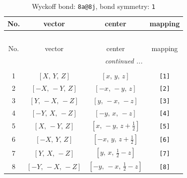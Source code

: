\documentclass[fleqn,8pt]{jsarticle}
\begin{document}
\begin{longtable}{cccc}
\caption{Wyckoff bond: {\tt 8a@8j}, bond symmetry: {\tt 1}}
 \\
 \hline \hline
No. & vector & center & mapping \\ \hline \endfirsthead

\multicolumn{3}{l}{\tablename\ \thetable{}} \\
 \hline \hline
No. & vector & center & mapping \\ \hline \endhead

 \hline \hline
\multicolumn{3}{r}{\footnotesize\it continued ...} \\ \endfoot

 \hline \hline
\multicolumn{3}{r}{} \\ \endlastfoot

1 & $\left[ X,\, Y,\, Z \right]$ & $\left[ x,\, y,\, z \right]$ & {\tt [1]} \\ \hline
2 & $\left[ - X,\, - Y,\, Z \right]$ & $\left[ - x,\, - y,\, z \right]$ & {\tt [2]} \\ \hline
3 & $\left[ Y,\, - X,\, - Z \right]$ & $\left[ y,\, - x,\, - z \right]$ & {\tt [3]} \\ \hline
4 & $\left[ - Y,\, X,\, - Z \right]$ & $\left[ - y,\, x,\, - z \right]$ & {\tt [4]} \\ \hline
5 & $\left[ X,\, - Y,\, Z \right]$ & $\left[ x,\, - y,\, z + \frac{1}{2} \right]$ & {\tt [5]} \\ \hline
6 & $\left[ - X,\, Y,\, Z \right]$ & $\left[ - x,\, y,\, z + \frac{1}{2} \right]$ & {\tt [6]} \\ \hline
7 & $\left[ Y,\, X,\, - Z \right]$ & $\left[ y,\, x,\, \frac{1}{2} - z \right]$ & {\tt [7]} \\ \hline
8 & $\left[ - Y,\, - X,\, - Z \right]$ & $\left[ - y,\, - x,\, \frac{1}{2} - z \right]$ & {\tt [8]} \\
\end{longtable}
\end{document}
